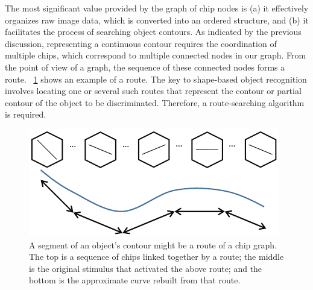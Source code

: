 \documentclass[journal]{IEEEtran}
\begin{document}
The most significant value provided by the graph of chip nodes is 
(a) it effectively organizes raw image data, which is converted into an ordered structure, 
and (b) it facilitates the process of searching object contours. 
As indicated by the previous discussion, 
representing a continuous contour requires the coordination of multiple chips, 
which correspond to multiple connected nodes in our graph.
From the point of view of a graph, the sequence of these connected nodes forms a route.
\figurename~\ref{fig:9} shows an example of a route. 
The key to shape-based object recognition involves locating one or several such routes
that represent the contour or partial contour of the object to be discriminated.
Therefore, a route-searching algorithm is required.

\begin{figure}[!t]
\centering
\includegraphics[width=0.5\linewidth]{images/fig9.pdf}
\caption{A segment of an object's contour might be a route of a chip graph. 
The top is a sequence of chips linked together by a route; 
the middle is the original stimulus that activated the above route; 
and the bottom is the approximate curve rebuilt from that route. }
\label{fig:9}
\end{figure}
\end{document}
